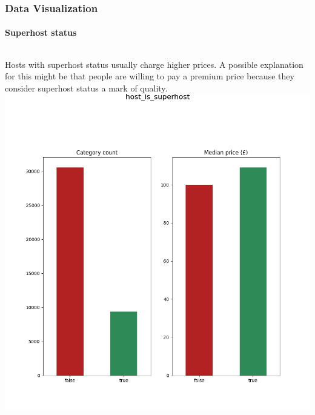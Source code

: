 \documentclass{beamer}
\begin{document}
\begin{frame}
  \frametitle{Data Visualization}
  \framesubtitle{Superhost status}
  \begin{columns}
Hosts with superhost status usually charge higher prices. A possible explanation
for this might be that people are willing to pay a premium price because they
consider superhost status a mark of quality.
      \includegraphics[width=\textwidth]{figures/Figure_16_host_is_superhost.png}
  \end{columns}
\end{frame}
\end{document}
